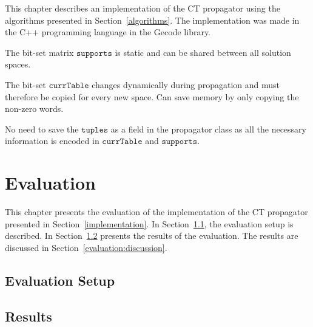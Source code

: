 \documentclass[a4paper,11pt]{article}
\newcommand{\T}[1]{\texttt{#1}}
\newcommand{\Secref}[1]{Section~\ref{#1}}
\newcommand{\Chapref}[1]{Section~\ref{#1}}
\newcommand{\CurrTable}{\texttt{currTable}}
\newcommand{\Supports}{\texttt{supports}}
\numberwithin{equation}{section}
\begin{document}
This chapter describes an implementation of the CT propagator using the algorithms
presented in \Chapref{algorithms}. The implementation was made in the C++ programming
language in the Gecode library.

The bit-set matrix $\Supports$ is static and can be shared between all solution spaces.

The bit-set $\CurrTable$ changes dynamically during propagation and must therefore be copied for
every new space. Can save memory by only copying the non-zero words.

No need to save the $\T{tuples}$ as a field in the propagator class as all
the necessary information is encoded in $\CurrTable$ and $\Supports$.










\section{Evaluation}
\label{evaluation}
This chapter presents the evaluation of the implementation of the CT propagator
presented in \Chapref{implementation}. In \Secref{evaluation:setup},
the evaluation setup is described. In \Secref{evaluation:results} presents
the results of the evaluation. The results are discussed in \Secref{evaluation:discussion}.

\subsection{Evaluation Setup}
\label{evaluation:setup}
\subsection{Results}
\label{evaluation:results}
\end{document}
